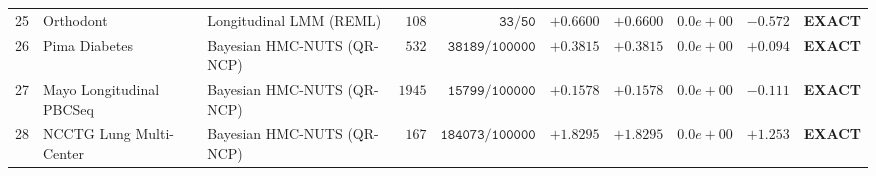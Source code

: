 \begin{table}[!t]
{\begin{tabular}{@{}r l l r r r r r r c@{}}
25 & Orthodont & Longitudinal LMM (REML) & $108$ & $\texttt{33/50}$ & $\bm{+0.6600}$ & $\bm{+0.6600}$ & $0.0e+00$ & $-0.572$ & \textbf{EXACT} \\
26 & Pima Diabetes & Bayesian HMC-NUTS (QR-NCP) & $532$ & $\texttt{38189/100000}$ & $\bm{+0.3815}$ & $\bm{+0.3815}$ & $0.0e+00$ & $+0.094$ & \textbf{EXACT} \\
27 & Mayo Longitudinal PBCSeq & Bayesian HMC-NUTS (QR-NCP) & $1945$ & $\texttt{15799/100000}$ & $\bm{+0.1578}$ & $\bm{+0.1578}$ & $0.0e+00$ & $-0.111$ & \textbf{EXACT} \\
28 & NCCTG Lung Multi-Center & Bayesian HMC-NUTS (QR-NCP) & $167$ & $\texttt{184073/100000}$ & $\bm{+1.8295}$ & $\bm{+1.8295}$ & $0.0e+00$ & $+1.253$ & \textbf{EXACT} \\
\bottomrule
\end{tabular}%
}
\end{table}
